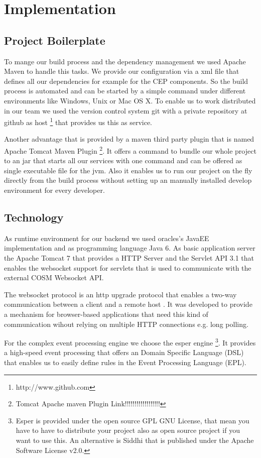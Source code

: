 \documentclass{acm_proc_article-sp}
\begin{document}
\section{Implementation}
\label{sec:Implementation}

\subsection{Project Boilerplate}
To mange our build process and the dependency management we used Apache Maven to handle this tasks. We provide our configuration via a xml file that defines all our  dependencies for example for the CEP components.
So the build process is automated and can be started by a simple command under different environments like Windows, Unix or Mac OS X.
To enable us to work distributed in our team we used the version control system git with a private repository at github as host
\footnote{http://www.github.com}
that provides us this as service.

Another advantage that is provided by a maven third party plugin that is named Apache Tomcat Maven Plugin
\footnote{Tomcat Apache maven Plugin Link!!!!!!!!!!!!!!!!!!}.
It offers a command to bundle our whole project to an jar that starts all our services with one command and can be offered as single executable file for the jvm.
Also it enables us to run our project on the fly directly from the build process without setting up an manually installed develop environment for every developer.

\subsection{Technology}
As runtime environment for our backend we used oracles's JavaEE\cite{java6} implementation and as programming language Java 6. As basic application server the Apache Tomcat 7 \cite{tomcat} that provides a HTTP Server and the Servlet API 3.1\cite{servlet31} that enables the websocket support for servlets that is used to communicate with the external COSM Websocket API\cite{cosm}.

The websocket protocol is an http upgrade protocol that enables a two-way communication between a client and a remote host \cite{websocket}. It was developed to provide a mechanism for browser-based applications that need this kind of communication wihout relying on multiple HTTP connections e.g. long polling\cite{long_polling}. 

For the complex event processing engine we choose the esper engine\cite{esper}
\footnote{Esper is provided under the open source GPL GNU License, that mean you have to have to distribute your project also as open source project if you want to use this. An alternative is Siddhi\cite{siddhi} that is published under the Apache Software License v2.0.}.
It provides a high-speed event processing that offers an Domain Specific Language (DSL) that enables us to easily define rules in the Event Processing Language (EPL).
\end{document}
